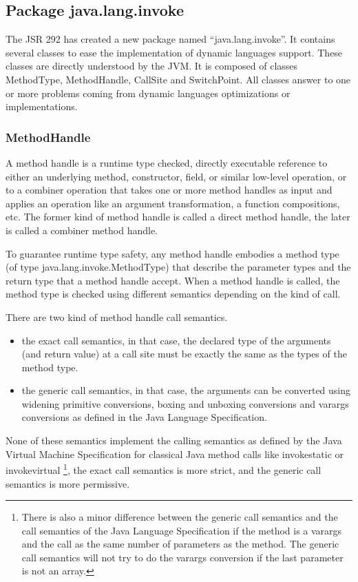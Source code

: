 \documentclass{sigplanconf}
\def \Jsr{JSR\xspace}
\def \JSR{\Jsr 292\xspace}
\def \JVM{JVM\xspace}
\begin{document}
      \subsection{Package java.lang.invoke}

      The \JSR has created a new package named ``java.lang.invoke''.
      It contains several classes to ease the implementation of dynamic languages support.
      These classes are directly understood by the \JVM.
      It is composed of classes MethodType, MethodHandle, CallSite and SwitchPoint.
      All classes answer to one or more problems coming from dynamic languages optimizations or implementations.



      \subsubsection{MethodHandle}
        A method handle is a runtime type checked, directly executable reference to
        either an underlying method, constructor, field, or similar low-level operation,
        or to a combiner operation that takes one or more method handles as input and
        applies an operation like an argument transformation, a function compositions, etc.
        The former kind of method handle is called a direct method handle,
        the later is called a combiner method handle.
        
        To guarantee runtime type safety, any method handle embodies a method type (of type java.lang.invoke.MethodType)
        that describe the parameter types and the return type that a method handle accept.
        When a method handle is called, the method type is checked using different semantics depending on the
        kind of call.

        There are two kind of method handle call semantics. 
        \begin{itemize}
          \item the exact call semantics, in that case, the declared type of the arguments (and return value) at a call site
                must be exactly the same as the types of the method type.
          \item the generic call semantics, in that case, the arguments can be converted using widening primitive conversions,
                boxing and unboxing conversions and varargs conversions as defined in the Java Language Specification.
        \end{itemize}
        None of these semantics implement the calling semantics as defined by the Java Virtual Machine Specification
        for classical Java method calls like invokestatic or invokevirtual
        \footnote{There is also a minor difference between the generic call semantics and the call semantics of
         the Java Language Specification if the method is a varargs and the call as the same number of parameters as the method.
         The generic call semantics will not try to do the varargs conversion if the last parameter is not an array.},
        the exact call semantics is more strict, and the generic call semantics is more permissive.
\end{document}
